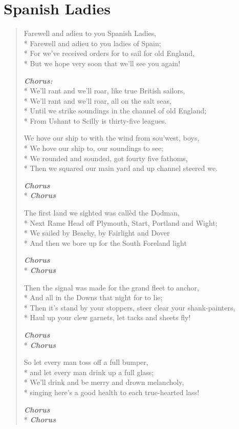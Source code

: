 \documentclass[9pt,twoside]{extarticle}
\makeatletter
\newenvironment{xverse}{
	\begin{verse}
	\fontsize{8.5}{10.5}\selectfont
}{
	\end{verse}
}
\newcommand{\chorusdef}{\textbf{\emph{Chorus:}}\\*}
\newcommand{\chorus@mark}[1][1]{%
\textbf{\emph{Chorus \ifthenelse{\equal{#1}{1}}{}{$\times$ #1}}}%
}
\newcommand{\chorusmark}[1][1]{%
\ifvmode%
\vspace{-0.5\stanzaskip}%
\chorus@mark[#1]%
\vspace{-0.5\stanzaskip}%
\else \\*%
\chorus@mark[#1]%
\fi%
}
\makeatother
\begin{document}
\section{Spanish Ladies}

\begin{xverse}
Farewell and adieu to you Spanish Ladies, \\*
Farewell and adieu to you ladies of Spain; \\*
For we’ve received orders for to sail for old England, \\*
But we hope very soon that we’ll see you again!

\chorusdef
We’ll rant and we’ll roar, like true British sailors, \\*
We’ll rant and we’ll roar, all on the salt seas, \\*
Until we strike soundings in the channel of old England; \\*
From Ushant to Scilly is thirty-five leagues.
 
We hove our ship to with the wind from sou’west, boys, \\*
We hove our ship to, our soundings to see; \\*
We rounded and sounded, got fourty five fathoms, \\*
Then we squared our main yard and up channel steered we.

\chorusmark

The first land we sighted was callèd the Dodman, \\*
Next Rame Head off Plymouth, Start, Portland and Wight; \\*
We sailed by Beachy, by Fairlight and Dover \\*
And then we bore up for the South Foreland light

\chorusmark

Then the signal was made for the grand fleet to anchor, \\*
And all in the Downs that night for to lie; \\*
Then it's stand by your stoppers, steer clear your shank-painters, \\*
Haul up your clew garnets, let tacks and sheets fly!

\chorusmark

So let every man toss off a full bumper, \\*
and let every man drink up a full glass; \\*
We'll drink and be merry and drown melancholy, \\*
singing here's a good health to each true-hearted lass!

\chorusmark
\end{xverse}
\end{document}

